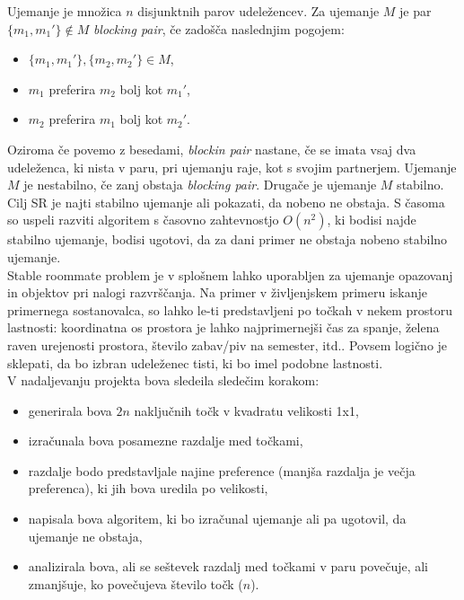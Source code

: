 \documentclass[12pt, a4paper]{article}
\begin{document}
Ujemanje je množica $n$ disjunktnih parov udeležencev.
Za ujemanje $M$ je par $\{m_{1}, m_{1}' \} \notin M$ \textit{blocking pair}, če zadošča naslednjim pogojem:
\begin{itemize}
	\item  $\{m_{1}, m_{1}' \}, \{m_{2}, m_{2}' \} \in M$,
	\item $m_1$ preferira $m_2$ bolj kot $m_1'$,
	\item $m_2$ preferira $m_1$ bolj kot $m_2'$.
\end{itemize}
Oziroma če povemo z besedami, \textit{blockin pair} nastane, če se imata vsaj dva udeleženca, ki nista v paru, pri ujemanju raje, kot s svojim partnerjem.
Ujemanje $M$ je nestabilno, če zanj obstaja \textit{blocking pair}. Drugače je ujemanje $M$ stabilno.\\

Cilj SR je najti stabilno ujemanje ali pokazati, da nobeno ne obstaja. S časoma so uspeli razviti algoritem s časovno zahtevnostjo $O(n^2)$, ki bodisi najde stabilno ujemanje, bodisi ugotovi, da za dani primer ne obstaja nobeno stabilno ujemanje.\\

Stable roommate problem je v splošnem lahko uporabljen za ujemanje opazovanj in objektov pri nalogi razvrščanja. Na primer v življenjskem primeru iskanje primernega sostanovalca, so lahko le-ti predstavljeni po točkah v nekem prostoru lastnosti: koordinatna os prostora je lahko najprimernejši čas za spanje, želena raven urejenosti prostora, število zabav/piv na semester, itd.. Povsem logično je sklepati, da bo izbran udeleženec tisti, ki bo imel podobne lastnosti. \\

\pagebreak
V nadaljevanju projekta bova sledeila sledečim korakom:
\begin{itemize}
	\item generirala bova $2n$ naključnih točk v kvadratu velikosti 1x1,
	\item izračunala bova posamezne razdalje med točkami,
	\item razdalje bodo predstavljale najine preference (manjša razdalja je večja preferenca), ki jih bova uredila po velikosti,
	\item napisala bova algoritem, ki bo izračunal ujemanje ali pa ugotovil, da ujemanje ne obstaja,
	\item analizirala bova, ali se seštevek razdalj med točkami v paru povečuje, ali zmanjšuje, ko povečujeva število točk ($n$).
\end{itemize}
\end{document}

